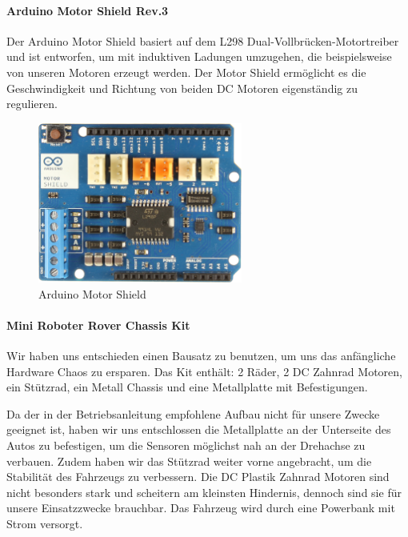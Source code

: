 \documentclass[12pt]{article}
\begin{document}
\paragraph{Arduino Motor Shield Rev.3} Der Arduino Motor Shield basiert auf dem L298 Dual-Vollbrücken-Motortreiber und ist entworfen, um mit induktiven Ladungen umzugehen, die beispielsweise von unseren Motoren erzeugt werden. Der Motor Shield ermöglicht es die Geschwindigkeit und Richtung von beiden DC Motoren eigenständig zu regulieren.

\vspace{0.5cm}
\begin{figure}[thb]
\includegraphics[width=0.6\textwidth]{images/MotorShield_Front.jpg}\par
\caption{Arduino Motor Shield \cite{motorShield-front}}
\end{figure}

\paragraph{Mini Roboter Rover Chassis Kit} Wir haben uns entschieden einen Bausatz zu benutzen, um uns das anfängliche Hardware Chaos zu ersparen. Das Kit enthält: 2 Räder, 2 DC Zahnrad Motoren, ein Stützrad, ein Metall Chassis und eine Metallplatte mit Befestigungen.

Da der in der Betriebsanleitung empfohlene Aufbau nicht für unsere Zwecke geeignet ist, haben wir uns entschlossen die Metallplatte an der Unterseite des Autos zu befestigen, um die Sensoren möglichst nah an der Drehachse zu verbauen. Zudem haben wir das Stützrad weiter vorne angebracht, um die Stabilität des Fahrzeugs zu verbessern. Die DC Plastik Zahnrad Motoren sind nicht besonders stark und scheitern am kleinsten Hindernis, dennoch sind sie für unsere Einsatzzwecke brauchbar. Das Fahrzeug wird durch eine Powerbank mit Strom versorgt.

\vspace{0.5cm}
\end{document}
